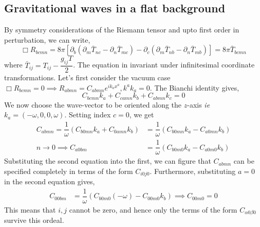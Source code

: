 \documentclass[a4paper,11pt]{article}
\begin{document}
\subsection{Gravitational waves in a flat background}
By symmetry considerations of the Riemann tensor and upto first order in perturbation, we can write,
\begin{equation*}
\Box R_{bcmn } = 8 \pi [\partial_b(\partial_m \bar{T}_{nc} - \partial_n \bar{T}_{mc} ) - \partial_c(\partial_m \bar{T}_{nb} - \partial_n \bar{T}_{mb} )] = 8 \pi \bar{T}_{bcmn}
\end{equation*}
where $ \bar{T}_{ij} = T_{ij} -\dfrac{g_{ij} T}{2} $. The equation in invariant under infinitesimal coordinate transformations. Let's first consider the vacuum case $ \Box R_{bcmn } =0 \implies R_{abmn} = C_{abmn} e^{i k_a x^a}, k^a k_a = 0$. The Bianchi identity gives,
\begin{equation*}
C_{bcmn} k_a + C_{camn}k_b + C_{abmn}k_c =0 
\end{equation*}
We now choose the wave-vector to be oriented along the $ z $-axis \textit{ie} $ k_a = (-\omega, 0 , 0 , \omega) $. Setting index $ c=0 $, we get
\begin{align*}
C_{abmn} = \dfrac{1}{\omega}(C_{b0mn} k_a + C_{0amn}k_b ) &= \dfrac{1}{\omega}(C_{b0mn} k_a - C_{a0mn}k_b ) \\
n \rightarrow 0 \implies C_{a0bm} &= \dfrac{1}{\omega}(C_{b0m0} k_a - C_{a0m0}k_b )
\end{align*}
Substituting the second equation into the first, we can figure that $ C_{abmn} $ can be specified completely in terms of the form $ C_{i0j0} $. Furthermore, substituting $a=0$ in the second equation gives,
\begin{align*}
 C_{00bm} &= \dfrac{1}{\omega}(C_{b0m0} (-\omega) - C_{00m0}k_b ) \implies C_{00m0}=0
\end{align*}
This means that $ i,j $ cannot be zero, and hence only the terms of the form $ C_{\alpha 0 \beta 0} $ survive this ordeal.
\end{document}
